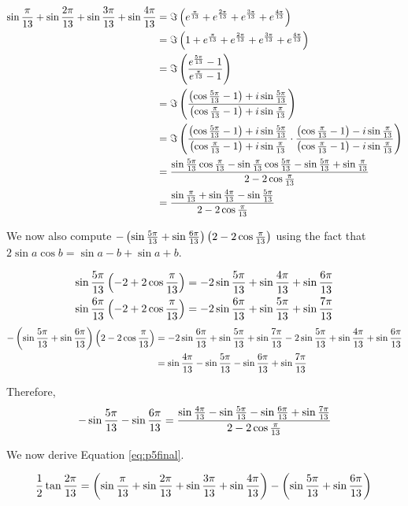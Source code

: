\documentclass[10pt]{../usamts}
\begin{document}
\begin{solution}
\begin{align*}
    \sin{{\frac{\pi}{13}}} + \sin{{\frac{2\pi}{13}}} + \sin{{\frac{3\pi}{13}}} + \sin{{\frac{4\pi}{13}}}
    &=\Im\left( e^{\frac{\pi}{13}} + e^{\frac{2\pi}{13}} + e^{\frac{3\pi}{13}} + e^{\frac{4\pi}{13}} \right) \\
    &= \Im\left( 1 + e^{\frac{\pi}{13}} + e^{\frac{2\pi}{13}} + e^{\frac{3\pi}{13}} + e^{\frac{4\pi}{13}} \right)\\
    &= \Im\left( \frac{e^{\frac{5\pi}{13}} - 1}{e^{\frac{\pi}{13}} - 1} \right) \\
    &= \Im\left( \frac{\left( \cos{{\frac{5\pi}{13}}}-1 \right) + i\sin{{\frac{5\pi}{13}}}}{\left( \cos{{\frac{\pi}{13}}}-1 \right) + i\sin{{\frac{\pi}{13}}}} \right) \\
    &= \Im\left( \frac{\left( \cos{{\frac{5\pi}{13}}}-1 \right) + i\sin{{\frac{5\pi}{13}}}}{\left( \cos{{\frac{\pi}{13}}}-1 \right) + i\sin{{\frac{\pi}{13}}}}
    \cdot \frac{\left( \cos{{\frac{\pi}{13}}}-1 \right) - i\sin{{\frac{\pi}{13}}}}{\left( \cos{{\frac{\pi}{13}}}-1 \right) - i\sin{{\frac{\pi}{13}}}} \right)\\
    &= \frac{\sin{{\frac{5\pi}{13}}}\cos{{\frac{\pi}{13}}}  - \sin{{\frac{\pi}{13}}}\cos{{\frac{5\pi}{13}}} - \sin{{\frac{5\pi}{13}}} + \sin{{\frac{\pi}{13}}}}
    {2 - 2\cos{{\frac{\pi}{13}}}} \\
    &= \frac{\sin{{\frac{\pi}{13}}} + \sin{{\frac{4\pi}{13}}} - \sin{{\frac{5\pi}{13}}}} {2 - 2\cos{{\frac{\pi}{13}}}}
\end{align*}

We now also compute $-\left( \sin{{\frac{5\pi}{13}}} + \sin{{\frac{6\pi}{13}}} \right)\left( 2 - 2\cos{{\frac{\pi}{13}}} \right)$ using the fact that $2\sin{a}\cos{b} = \sin{a-b} + \sin{a+b}$.

\begin{align*}
    \sin{{\frac{5\pi}{13}}}\left( -2 + 2\cos{{\frac{\pi}{13}}} \right) &= -2\sin{{\frac{5\pi}{13}}} + \sin{{\frac{4\pi}{13}}} + \sin{{\frac{6\pi}{13}}} \\
    \sin{{\frac{6\pi}{13}}}\left( -2 + 2\cos{{\frac{\pi}{13}}} \right) &= -2\sin{{\frac{6\pi}{13}}} + \sin{{\frac{5\pi}{13}}} + \sin{{\frac{7\pi}{13}}}
\end{align*}
\begin{align*}
    -\left( \sin{{\frac{5\pi}{13}}} + \sin{{\frac{6\pi}{13}}} \right)\left( 2 - 2\cos{{\frac{\pi}{13}}} \right)
    &= -2\sin{{\frac{6\pi}{13}}} + \sin{{\frac{5\pi}{13}}} + \sin{{\frac{7\pi}{13}}} -2\sin{{\frac{5\pi}{13}}} + \sin{{\frac{4\pi}{13}}} + \sin{{\frac{6\pi}{13}}} \\
    &= \sin{{\frac{4\pi}{13}}} - \sin{{\frac{5\pi}{13}}} -\sin{{\frac{6\pi}{13}}} + \sin{{\frac{7\pi}{13}}}
\end{align*}

Therefore,
\[
-\sin{{\frac{5\pi}{13}}} -\sin{{\frac{6\pi}{13}}} = \frac{\sin{{\frac{4\pi}{13}}} - \sin{{\frac{5\pi}{13}}} -\sin{{\frac{6\pi}{13}}} + \sin{{\frac{7\pi}{13}}}}{2 - 2 \cos{{\frac{\pi}{13}}}}
\]

We now derive Equation \ref{eq:p5final}.

\begin{equation*}
    \frac{1}{2} \tan{{\frac{2\pi}{13}}} = \left( \sin{{\frac{\pi}{13}}} + \sin{{\frac{2\pi}{13}}} + \sin{{\frac{3\pi}{13}}} + \sin{{\frac{4\pi}{13}}} \right) - \left( \sin{{\frac{5\pi}{13}}} + \sin{{\frac{6\pi}{13}}} \right) \\
\end{equation*}


\end{solution}
\end{document}
